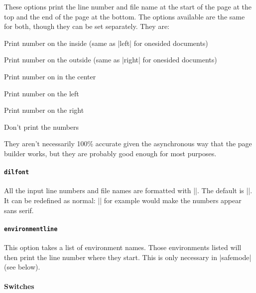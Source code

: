 \documentclass{scrartcl}
\begin{document}
These options print the line number and file name at the start of the
page at the top and the end of the page at the bottom. 
The options available are the same for both, though they can be set separately. 
They are:
\begin{description}[labelindent=1cm]
\item[inside] Print number on the inside (same as |left| for onesided
  documents)
\item[outside] Print number on the outside (same as |right| for
  onesided documents)
\item[center] Print number on in the center
\item[left] Print number on the left
\item[right] Print number on the right
\item[off] Don't print the numbers
\end{description}

They aren't necessarily 100\% accurate given the asynchronous way that
the page builder works, but they are probably good enough for most purposes.

\paragraph{\lstinline+dilfont+}

All the input line numbers and file names are formatted with |\dilfont|.
The default is |\ttfamily\small|.
It can be redefined as normal:
|\def\dilfont{\small\sffamily}| for example would make the numbers
appear sans serif.

\paragraph{\lstinline+environmentline+}

This option takes a list of environment names.
Those environments listed will then print the line number where they
start.
This is only necessary in |safemode| (see below).

\paragraph{Switches}
\end{document}
